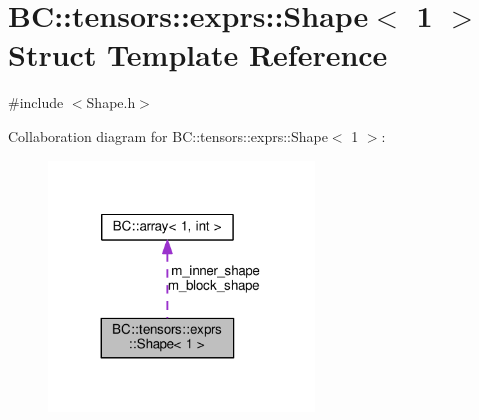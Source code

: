 \hypertarget{structBC_1_1tensors_1_1exprs_1_1Shape_3_011_01_4}{}\section{BC\+:\+:tensors\+:\+:exprs\+:\+:Shape$<$ 1 $>$ Struct Template Reference}
\label{structBC_1_1tensors_1_1exprs_1_1Shape_3_011_01_4}


{\ttfamily \#include $<$Shape.\+h$>$}



Collaboration diagram for BC\+:\+:tensors\+:\+:exprs\+:\+:Shape$<$ 1 $>$\+:
\nopagebreak
\begin{figure}[H]
\begin{center}
\leavevmode
\includegraphics[width=200pt]{structBC_1_1tensors_1_1exprs_1_1Shape_3_011_01_4__coll__graph}
\end{center}
\end{figure}
